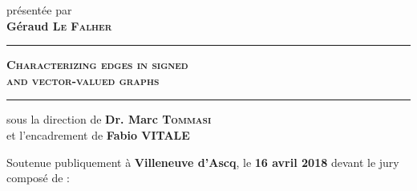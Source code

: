 \documentclass[a4paper,svgnames,twoside,onecolumn,final,titlepage,11pt]{book}
\begin{document}
\begin{titlepage}
\vspace{0.6cm}

\begin{center}
{\large présentée par \\
\LARGE \textbf{Géraud \textsc{Le Falher}} \\}
\end{center}

\vspace{1cm}
\addtolength{\oddsidemargin}{.275in}
	\addtolength{\evensidemargin}{.225in}
	\addtolength{\textwidth}{1.25in}
\begin{center}
\begin{minipage}{0.8\textwidth}
\begin{center}
\rule{\textwidth}{0.4pt}%
\begin{Huge}\textsc{ \textbf{Characterizing edges in signed \\[.2cm] and vector-valued graphs  }}\end{Huge}
\vspace{-.31cm}
\rule{\textwidth}{0.4pt}
\end{center}


\end{minipage}

\end{center}
\vspace{1.4cm}
\begin{center}
{\large sous la direction de \textbf{Dr. Marc \textsc{Tommasi}} \\}
{\large et l'encadrement de \textbf{Fabio VITALE} \\}
\end{center}
\vspace{2.8cm}
\begin{center}
\vrule height .4pt width.5\hsize

\vspace{0.3cm}
{Soutenue publiquement à \textbf{Villeneuve d'Ascq}, le \textbf{16 avril 2018} devant le jury composé de :}


\end{center}
\end{titlepage}
\end{document}
